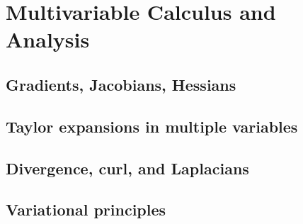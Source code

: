 ﻿\chapter{Multivariable Calculus and Analysis}
\section{Gradients, Jacobians, Hessians}

\section{Taylor expansions in multiple variables}

\section{Divergence, curl, and Laplacians}

\section{Variational principles}


